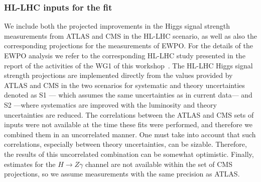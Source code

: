 
\subsubsection*{HL-LHC inputs for the fit}

We include both the projected improvements 
in the Higgs signal strength measurements from ATLAS and CMS in the HL-LHC scenario,
as well as also the corresponding projections for the measurements of EWPO.
For the details of the EWPO analysis we refer to the corresponding HL-LHC study 
presented in the report of the activities of the WG1 of this workshop~\cite{Azzi:2650160}.
%
The HL-LHC Higgs signal strength projections are implemented directly from the values
provided by ATLAS and CMS in the two scenarios for systematic and theory uncertainties
denoted as S1 --- which assumes the same uncertainties as in current data--- and S2 ---where systematics
are improved with the luminosity and theory uncertainties are reduced.
%
The correlations between the ATLAS and CMS sets of inputs were not available at the time
these fits were performed, and therefore we combined them in an uncorrelated manner. One must take into 
account that such correlations, especially between theory uncertainties, can be sizable. Therefore,
the results of this uncorrelated combination can be somewhat optimistic.
Finally, estimates for the $H\to Z\gamma$ channel are not available within the set of CMS projections, so we 
assume measurements with the same precision as ATLAS.

